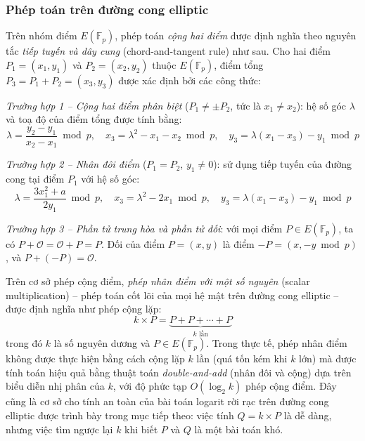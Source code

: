 \subsubsection{Phép toán trên đường cong elliptic}

Trên nhóm điểm $E(\mathbb{F}_p)$, phép toán \textit{cộng hai điểm} được định nghĩa theo nguyên tắc \textit{tiếp tuyến và dây cung} (chord-and-tangent rule) như sau. Cho hai điểm $P_1 = (x_1, y_1)$ và $P_2 = (x_2, y_2)$ thuộc $E(\mathbb{F}_p)$, điểm tổng $P_3 = P_1 + P_2 = (x_3, y_3)$ được xác định bởi các công thức:

\textit{Trường hợp 1 -- Cộng hai điểm phân biệt} ($P_1 \neq \pm P_2$, tức là $x_1 \neq x_2$): hệ số góc $\lambda$ và toạ độ của điểm tổng được tính bằng:
\begin{equation}
\lambda = \frac{y_2 - y_1}{x_2 - x_1} \bmod p, \quad x_3 = \lambda^2 - x_1 - x_2 \bmod p, \quad y_3 = \lambda(x_1 - x_3) - y_1 \bmod p
\label{eq:point-add}
\end{equation}

\textit{Trường hợp 2 -- Nhân đôi điểm} ($P_1 = P_2$, $y_1 \neq 0$): sử dụng tiếp tuyến của đường cong tại điểm $P_1$ với hệ số góc:
\begin{equation}
\lambda = \frac{3x_1^2 + a}{2y_1} \bmod p, \quad x_3 = \lambda^2 - 2x_1 \bmod p, \quad y_3 = \lambda(x_1 - x_3) - y_1 \bmod p
\label{eq:point-double}
\end{equation}

\textit{Trường hợp 3 -- Phần tử trung hòa và phần tử đối}: với mọi điểm $P \in E(\mathbb{F}_p)$, ta có $P + \mathcal{O} = \mathcal{O} + P = P$. Đối của điểm $P = (x, y)$ là điểm $-P = (x, -y \bmod p)$, và $P + (-P) = \mathcal{O}$.

Trên cơ sở phép cộng điểm, \textit{phép nhân điểm với một số nguyên} (scalar multiplication) -- phép toán cốt lõi của mọi hệ mật trên đường cong elliptic -- được định nghĩa như phép cộng lặp:
\begin{equation}
k \times P = \underbrace{P + P + \cdots + P}_{k \text{ lần}}
\label{eq:scalar-mult}
\end{equation}
trong đó $k$ là số nguyên dương và $P \in E(\mathbb{F}_p)$. Trong thực tế, phép nhân điểm không được thực hiện bằng cách cộng lặp $k$ lần (quá tốn kém khi $k$ lớn) mà được tính toán hiệu quả bằng thuật toán \textit{double-and-add} (nhân đôi và cộng) dựa trên biểu diễn nhị phân của $k$, với độ phức tạp $O(\log_2 k)$ phép cộng điểm. Đây cũng là cơ sở cho tính an toàn của bài toán logarit rời rạc trên đường cong elliptic được trình bày trong mục tiếp theo: việc tính $Q = k \times P$ là dễ dàng, nhưng việc tìm ngược lại $k$ khi biết $P$ và $Q$ là một bài toán khó.

